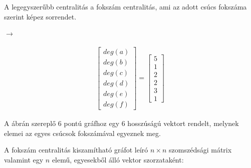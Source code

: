 \documentclass[12pt,numbers=noenddot]{report}
\begin{document}
A legegyszerűbb centralitás a fokszám centralitás, ami az adott csúcs fokszáma 
szerint képez sorrendet.


\noindent
\begin{minipage}[c]{0.4\linewidth}


\end{minipage}
\noindent
\begin{minipage}[c]{0.2\linewidth}

\hspace{0.5cm}
$\rightarrow$

\end{minipage}
\begin{minipage}[c]{0.2\linewidth}

\begin{align}
	\begin{bmatrix}
		deg(a)\\
		deg(b)\\
		deg(c)\\
		deg(d)\\
		deg(e)\\
		deg(f)
	\end{bmatrix}
	=
	\begin{bmatrix}
		5\\
		1\\
		2\\
		2\\
		3\\
		1
	\end{bmatrix}
\end{align}

\end{minipage}

\vspace{0.5cm}

A ábrán szereplő 6 pontú gráfhoz egy 6 hosszúságú vektort rendelt, 
melynek elemei az egyes csúcsok fokszámával egyeznek meg.

A fokszám centralitás kiszamítható gráfot leíró $n \times n$ szomszédsági 
mátrix valamint egy $n$ elemű, egyesekből álló vektor szorzataként:
\end{document}
